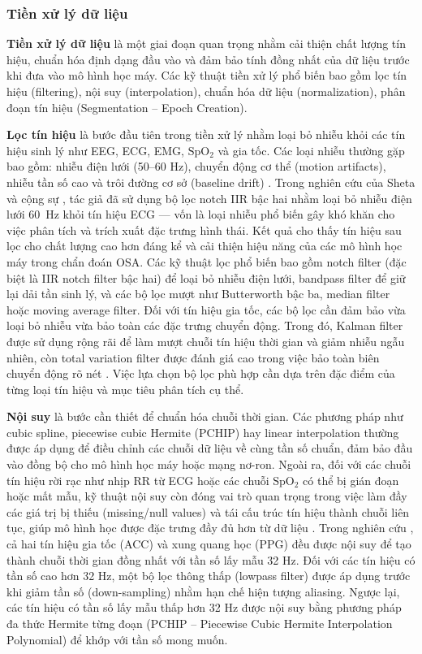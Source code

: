 \subsubsection{Tiền xử lý dữ liệu}

\textbf{Tiền xử lý dữ liệu} là một giai đoạn quan trọng nhằm cải thiện
chất lượng tín hiệu, chuẩn hóa định dạng đầu vào và đảm bảo tính đồng
nhất của dữ liệu trước khi đưa vào mô hình học máy. Các kỹ thuật tiền xử
lý phổ biến bao gồm lọc tín hiệu (filtering), nội suy (interpolation),
chuẩn hóa dữ liệu (normalization), phân đoạn tín hiệu (Segmentation – Epoch Creation).

\textbf{Lọc tín hiệu} là bước đầu tiên trong tiền xử lý nhằm loại bỏ nhiễu khỏi
các tín hiệu sinh lý như EEG, ECG, EMG, $\mathrm{SpO_2}$ và gia tốc.
Các loại nhiễu thường gặp bao gồm: nhiễu điện lưới (50–60 Hz),
chuyển động cơ thể (motion artifacts), nhiễu tần số cao và trôi đường
cơ sở (baseline drift) \cite{rossi2023sleep, sheta2021osa }.
Trong nghiên cứu của Sheta và cộng sự \cite{sheta2021osa}, tác giả đã sử
dụng bộ lọc notch IIR bậc hai nhằm loại bỏ nhiễu điện lưới 60~Hz khỏi
tín hiệu ECG — vốn là loại nhiễu phổ biến gây khó khăn cho việc phân
tích và trích xuất đặc trưng hình thái. Kết quả cho thấy tín hiệu sau
lọc cho chất lượng cao hơn đáng kể và cải thiện hiệu năng của các mô
hình học máy trong chẩn đoán OSA.
Các kỹ thuật lọc phổ biến bao gồm notch filter
(đặc biệt là IIR notch filter bậc hai) để loại bỏ nhiễu điện lưới,
bandpass filter để giữ lại dải tần sinh lý, và
các bộ lọc mượt như Butterworth bậc ba, median filter hoặc
moving average filter.
Đối với tín hiệu gia tốc, các bộ lọc cần đảm bảo vừa loại bỏ nhiễu vừa
bảo toàn các đặc trưng chuyển động. Trong đó, Kalman filter được sử dụng
rộng rãi để làm mượt chuỗi tín hiệu thời gian và giảm nhiễu ngẫu nhiên,
còn total variation filter được đánh giá cao trong việc bảo toàn biên
chuyển động rõ nét \cite{kalman, sun2017sleepmonitor}.
Việc lựa chọn bộ lọc phù hợp cần dựa trên đặc điểm của từng loại
tín hiệu và mục tiêu phân tích cụ thể.

\textbf{Nội suy}
là bước cần thiết để chuẩn hóa chuỗi thời gian. Các phương pháp như
cubic spline, piecewise cubic Hermite (PCHIP) hay linear interpolation
thường được áp dụng để điều chỉnh các chuỗi dữ liệu về cùng tần số chuẩn,
đảm bảo đầu vào đồng bộ cho mô hình học máy hoặc mạng nơ-ron.
Ngoài ra, đối với các chuỗi tín hiệu rời rạc như nhịp RR từ ECG
hoặc các chuỗi $\mathrm{SpO_2}$ có thể bị gián đoạn hoặc mất mẫu,
kỹ thuật nội suy còn đóng vai trò quan trọng trong việc làm đầy các
giá trị bị thiếu (missing/null values) và tái cấu trúc tín hiệu thành
chuỗi liên tục, giúp mô hình học được đặc trưng đầy đủ hơn từ
dữ liệu \cite{zou2024mbtcn}.
Trong nghiên cứu \cite{olsen2024transfer},
cả hai tín hiệu gia tốc (ACC) và xung quang học (PPG)
đều được nội suy để tạo thành chuỗi thời gian đồng nhất với
tần số lấy mẫu 32 Hz.
Đối với các tín hiệu có tần số cao hơn 32 Hz,
một bộ lọc thông thấp (lowpass filter) được áp dụng trước khi giảm
tần số (down-sampling) nhằm hạn chế hiện tượng aliasing.
Ngược lại, các tín hiệu có tần số lấy mẫu thấp hơn 32 Hz được
nội suy bằng phương pháp đa thức Hermite từng đoạn
(PCHIP – Piecewise Cubic Hermite Interpolation Polynomial)
để khớp với tần số mong muốn.

